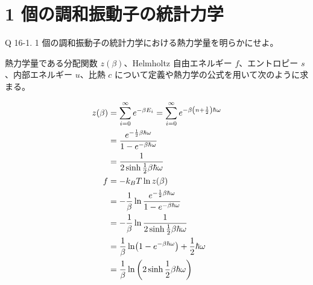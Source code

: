 \documentclass[uplatex,dvipdfmx,a4paper,11pt]{jlreq}
\theoremstyle{definition}
\begin{document}
\section{1 個の調和振動子の統計力学}
\begin{itembox}[l]{Q 16-1.}
  1 個の調和振動子の統計力学における熱力学量を明らかにせよ。
\end{itembox}

熱力学量である分配関数 $z(\beta)$、Helmholtz 自由エネルギー $f$、エントロピー $s$、内部エネルギー $u$、比熱 $c$ について定義や熱力学の公式を用いて次のように求まる。

\begin{align}
  z(\beta) & = \sum_{i = 0}^{\infty}e^{-\beta E_i} = \sum_{i = 0}^{\infty}e^{-\beta\qty(n + \frac{1}{2})\hbar\omega}                                                                                  \\
           & = \frac{e^{-\frac{1}{2}\beta\hbar\omega}}{1 - e^{-\beta\hbar\omega}}                                                                                                                     \\
           & = \frac{1}{2\sinh \frac{1}{2}\beta\hbar\omega}                                                                                                                                           \\
  f        & = -k_BT\ln z(\beta)                                                                                                                                                                      \\
           & = -\frac{1}{\beta}\ln \frac{e^{-\frac{1}{2}\beta\hbar\omega}}{1 - e^{-\beta\hbar\omega}}                                                                                                 \\
           & = -\frac{1}{\beta}\ln \frac{1}{2\sinh \frac{1}{2}\beta\hbar\omega}                                                                                                                       \\
           & = \frac{1}{\beta}\ln(1 - e^{-\beta\hbar\omega}) + \frac{1}{2}\hbar\omega                                                                                                                 \\
           & = \frac{1}{\beta}\ln\qty(2\sinh \frac{1}{2}\beta\hbar\omega)                                                                                                                             \\

\end{align}
\end{document}
